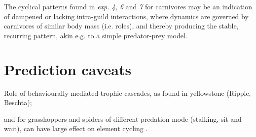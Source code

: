 The cyclical patterns found in \textit{exp. 4, 6} and \textit{7} for carnivores may be an indication of dampened or lacking intra-guild interactions, where dynamics are governed by carnivores of similar body mass (i.e. roles), and thereby producing the stable, recurring pattern,  akin e.g. to a simple predator-prey model.

\section{Prediction caveats}
Role of behaviourally mediated trophic cascades,  as found in yellowstone (Ripple, Beschta);




 and for grasshoppers and spiders of different predation mode (stalking, sit and wait), can have large effect on element cycling \cite{Schmitz2015}.